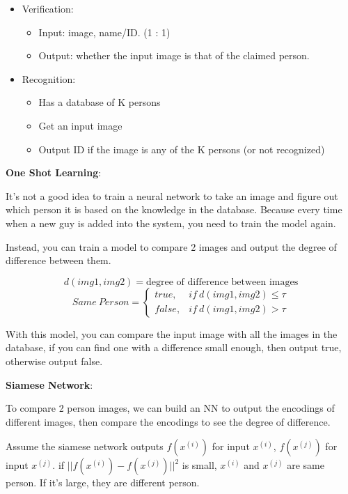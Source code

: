 \documentclass{article}
\begin{document}
\begin{itemize}
    \item Verification:
    \begin{itemize}
        \item Input: image, name/ID. (1 : 1)
        \item Output: whether the input image is that of the claimed person.
    \end{itemize}
    \item Recognition:
    \begin{itemize}
        \item Has a database of K persons
        \item Get an input image
        \item Output ID if the image is any of the K persons (or not recognized)
    \end{itemize}
\end{itemize}

\noindent \textbf{One Shot Learning}:

\noindent It's not a good idea to train a neural network to take an image and figure out which person it is based on the knowledge in the database. Because every time when a new guy is added into the system, you need to train the model again.

\bigskip

\noindent Instead, you can train a model to compare 2 images and output the degree of difference between them.

\[d(img1, img2) = \text{degree of difference between images}\]
\[
Same \ Person =
\begin{cases}
    true, & if \ d(img1, img2) \leq \tau\\
    false, & if \ d(img1, img2) > \tau
\end{cases}
\]

\noindent With this model, you can compare the input image with all the images in the database, if you can find one with a difference small enough, then output true,
otherwise output false.

\bigskip

\noindent \textbf{Siamese Network}:

\noindent To compare 2 person images, we can build an NN to output the encodings of different images, then compare the encodings to see the degree of difference.

\bigskip

\noindent Assume the siamese network outputs \(f(x^{(i)})\) for input \(x^{(i)}\), \(f(x^{(j)})\) for input \(x^{(j)}\). if \(||f(x^{(i)}) - f(x^{(j)})||^{2}\) is small, \(x^{(i)}\) and \(x^{(j)}\) are same person. If it's large, they are different person.
\end{document}

